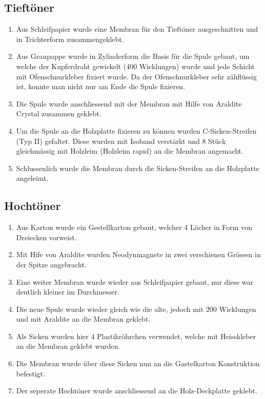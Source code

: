 \documentclass[a4paper,11pt]{report}
\begin{document}
\subsection{Tieftöner}
\begin{enumerate}
    \item Aus Schleifpapier wurde eine Membran für den Tieftöner ausgeschnitten und in Trichterform zusammengeklebt.
    \item Aus Graupappe wurde in Zylinderform die Basis für die Spule gebaut, um welche der Kupferdraht gewickelt (400 Wicklungen) wurde und jede Schicht mit Ofenschnurkleber fixiert wurde. Da der Ofenschnurkleber sehr zähflüssig ist, konnte man nicht nur am Ende die Spule fixieren.
    \item Die Spule wurde anschliessend mit der Membran mit Hilfe von Araldite Crystal zusammen geklebt.
    \item Um die Spule an die Holzplatte fixieren zu können wurden C-Sicken-Streifen (Typ II) gefaltet. Diese wurden mit Isoband verstärkt und 8 Stück gleichmässig mit Holzleim (Holzleim rapid) an die Membran angemacht.
    \item Schlussenlich wurde die Membran durch die Sicken-Streifen an die Holzplatte angeleimt.
\end{enumerate}
\subsection{Hochtöner}
\begin{enumerate}
    \item Aus Karton wurde ein Gestellkarton gebaut, welcher 4 Löcher in Form von Dreiecken vorweist.
    \item Mit Hife von Araldite wurden Neodynmagnete in zwei verschienen Grössen in der Spitze angebracht.
    \item Eine weiter Membran wurde wieder aus Schleifpapier gebaut, nur diese war deutlich kleiner im Durchmesser.
    \item Die neue Spule wurde wieder gleich wie die alte, jedoch mit 200 Wicklungen und mit Araldite an die Membran geklebt.
    \item Als Sicken wurden hier 4 Plastikröhrchen verwendet, welche mit Heisskleber an die Membran geklebt wurden.
    \item Die Membran wurde über diese Sicken nun an die Gastelkarton Konstruktion befestigt.
    \item Der seperate Hochtöner wurde anschliessend an die Holz-Deckplatte geklebt.
\end{enumerate}
\end{document}
